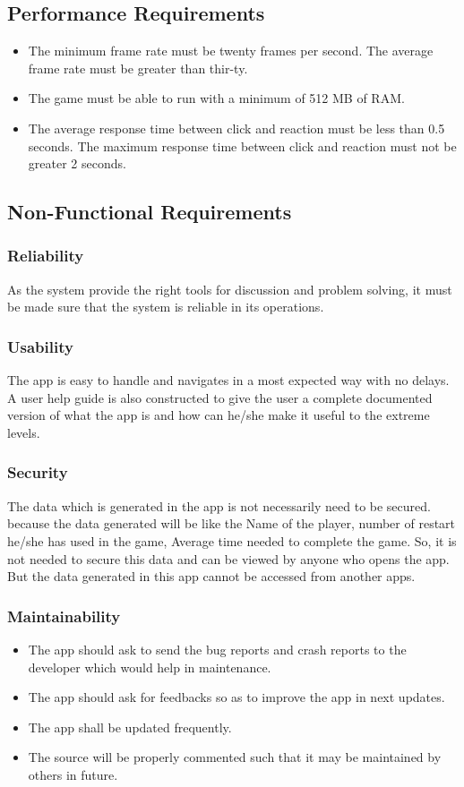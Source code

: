\documentclass[a4paper,11pt]{article}
\begin{document}
\subsection{Performance Requirements}
\begin{itemize}
\item The minimum frame rate must be twenty frames per second.  The average frame rate must be greater than thir-ty.
\item The game must be able to run with a minimum of 512 MB of RAM.
\item The average response time between click and reaction must be less than 0.5 seconds. The maximum response time between click and reaction must not be greater 2 seconds.
\end{itemize}
\subsection{Non-Functional Requirements}
\subsubsection{Reliability}
		As the system provide the right tools for discussion and problem solving, it must be made sure that the system is reliable in its operations.
\subsubsection{Usability}
		The app is easy to handle and navigates in a most expected way with no delays. A user help guide is also constructed to give the user a complete documented version of what the app is and how can he/she make it useful to the extreme levels.
\subsubsection{Security}
		The data which is generated in the app is not necessarily need to be secured. because the data generated will be like the Name of the player, number of restart he/she has used in the game, Average time needed to complete the game. So, it is not needed to secure this data and can be viewed by anyone who opens the app. But the data generated in this app cannot be accessed from another apps.
\subsubsection{Maintainability}
\begin{itemize}
\item The app should ask to send the bug reports and crash reports to the developer which would help in maintenance.
\item The app should ask for feedbacks so as to improve the app in next updates.
\item The app shall be updated frequently.
\item The source will be properly commented such that it may be maintained by others in future.
\end{itemize}
\end{document}
